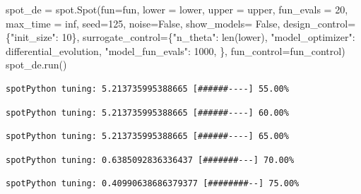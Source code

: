 \documentclass[
  letterpaper,
  DIV=11,
  numbers=noendperiod]{scrreprt}
\newenvironment{Shaded}{\begin{snugshade}}{\end{snugshade}}
\newcommand{\BuiltInTok}[1]{\textcolor[rgb]{0.00,0.23,0.31}{#1}}
\newcommand{\DecValTok}[1]{\textcolor[rgb]{0.68,0.00,0.00}{#1}}
\newcommand{\NormalTok}[1]{\textcolor[rgb]{0.00,0.23,0.31}{#1}}
\newcommand{\OperatorTok}[1]{\textcolor[rgb]{0.37,0.37,0.37}{#1}}
\newcommand{\StringTok}[1]{\textcolor[rgb]{0.13,0.47,0.30}{#1}}
\newcommand{\VariableTok}[1]{\textcolor[rgb]{0.07,0.07,0.07}{#1}}
\begin{document}
\begin{Shaded}
\begin{Highlighting}[]
\NormalTok{spot\_de }\OperatorTok{=}\NormalTok{ spot.Spot(fun}\OperatorTok{=}\NormalTok{fun,}
\NormalTok{                   lower }\OperatorTok{=}\NormalTok{ lower,}
\NormalTok{                   upper }\OperatorTok{=}\NormalTok{ upper,}
\NormalTok{                   fun\_evals }\OperatorTok{=} \DecValTok{20}\NormalTok{,}
\NormalTok{                   max\_time }\OperatorTok{=}\NormalTok{ inf,}
\NormalTok{                   seed}\OperatorTok{=}\DecValTok{125}\NormalTok{,}
\NormalTok{                   noise}\OperatorTok{=}\VariableTok{False}\NormalTok{,}
\NormalTok{                   show\_models}\OperatorTok{=} \VariableTok{False}\NormalTok{,}
\NormalTok{                   design\_control}\OperatorTok{=}\NormalTok{\{}\StringTok{"init\_size"}\NormalTok{: }\DecValTok{10}\NormalTok{\},}
\NormalTok{                   surrogate\_control}\OperatorTok{=}\NormalTok{\{}\StringTok{"n\_theta"}\NormalTok{: }\BuiltInTok{len}\NormalTok{(lower),}
                                      \StringTok{"model\_optimizer"}\NormalTok{: differential\_evolution,}
                                      \StringTok{"model\_fun\_evals"}\NormalTok{: }\DecValTok{1000}\NormalTok{,}
\NormalTok{                                      \},}
\NormalTok{                  fun\_control}\OperatorTok{=}\NormalTok{fun\_control)}
\NormalTok{spot\_de.run()}
\end{Highlighting}
\end{Shaded}

\begin{verbatim}
spotPython tuning: 5.213735995388665 [######----] 55.00% 
\end{verbatim}

\begin{verbatim}
spotPython tuning: 5.213735995388665 [######----] 60.00% 
\end{verbatim}

\begin{verbatim}
spotPython tuning: 5.213735995388665 [######----] 65.00% 
\end{verbatim}

\begin{verbatim}
spotPython tuning: 0.6385092836336437 [#######---] 70.00% 
\end{verbatim}

\begin{verbatim}
spotPython tuning: 0.40990638686379377 [########--] 75.00% 
\end{verbatim}
\end{document}
